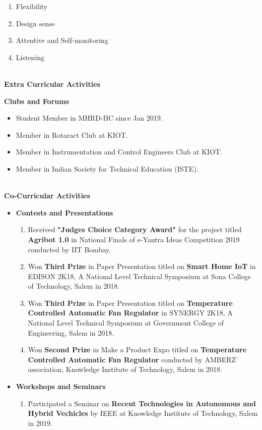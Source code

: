 \documentclass{article}
\begin{document}
\begin{flushleft}
\begin{enumerate}
			\item Flexibility
			\item Design sense
			\item Attentive and Self-monitoring
			\item Listening
		\end{enumerate}
		\large \textbf{\\Extra Curricular Activities}
		\item \textbf{Clubs and Forums}
			\begin{itemize}
					\setlength\itemsep{0.01em}
				\item Student Member in MHRD-IIC since Jan 2019.	
				\item Member in Rotaract Club at KIOT.
				\item Member in Instrumentation and Control Engineers Club at KIOT.
				\item Member in Indian Society for Technical Education (ISTE).
			\end{itemize}
		\large \textbf{\\Co-Curricular Activities}
		\begin{itemize}
			\item \textbf{Contests and Presentations}
			\begin{enumerate}
					\setlength\itemsep{0.01em}
				\item Received \textbf{"Judges Choice Category Award"} for the project titled \textbf{Agribot 1.0} in National Finals of e-Yantra Ideas Competition 2019 conducted by IIT Bombay.  
				\item Won \textbf{Third Prize} in Paper Presentation titled on \textbf{Smart Home IoT} in EDISON 2K18, A National Level Technical Symposium at Sona College of Technology, Salem in 2018.
				\item Won \textbf{Third Prize} in Paper Presentation titled on \textbf{Temperature Controlled Automatic Fan Regulator} in SYNERGY 2K18, A National Level Technical Symposium at Government College of Engineering, Salem in 2018.
				\item Won \textbf{Second Prize} in Make a Product Expo titled on \textbf{Temperature Controlled Automatic Fan Regulator} conducted by AMBERZ’ association, Knowledge Institute of Technology, Salem in 2018.
			\end{enumerate}
			\item \textbf{Workshops and Seminars}
			\begin{enumerate}
					\setlength\itemsep{0.01em}
				\item Participated a Seminar on \textbf{Recent Technologies in Autonomous and Hybrid Vechicles} by IEEE at Knowledge Institute of Technology, Salem in 2019.

\end{enumerate}
\end{itemize}
\end{flushleft}
\end{document}
